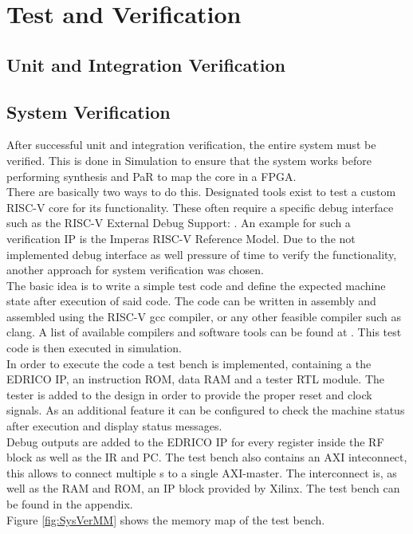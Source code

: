 \chapter{Test and Verification}
\section{Unit and Integration Verification}
\section{System Verification}
After successful unit and integration verification, the entire system must be verified. This is done in Simulation to ensure that the system works before performing synthesis and \ac{PaR} to map the core in a \ac{FPGA}.\\
There are basically two ways to do this. Designated tools exist to test a custom RISC-V core for its functionality. These often require a specific debug interface such as the RISC-V External Debug Support: \cite{riscv:debug}. An example for such a verification IP is the Imperas RISC-V Reference Model. Due to the not implemented debug interface as well pressure of time to verify the functionality, another approach for system verification was chosen. \\
The basic idea is to write a simple test code and define the expected machine state after execution of said code. The code can be written in assembly and assembled using the RISC-V gcc compiler, or any other feasible compiler such as clang. A list of available compilers and software tools can be found at \cite{RV:software}. This test code is then executed in simulation.\\
In order to execute the code a test bench is implemented, containing a the \ac{EDRICO} \ac{IP}, an instruction \ac{ROM}, data \ac{RAM} and a tester \ac{RTL} module. The tester is added to the design in order to provide the proper reset and clock signals. As an additional feature it can be configured to check the machine status after execution and display status messages.\\
Debug outputs are added to the \ac{EDRICO} \ac{IP} for every register inside the \ac{RF} block as well as the \ac{IR} and \ac{PC}. The test bench also contains an AXI inteconnect, this allows to connect multiple s to a single AXI-master. The interconnect is, as well as the \ac{RAM} and \ac{ROM}, an \ac{IP} block provided by Xilinx. The test bench can be found in the appendix.\\
Figure \ref{fig:SysVerMM} shows the memory map of the test bench.


